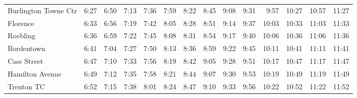 \begin{center}
\begin{tabular}{@{}lrrrrrrrrrrrrr@{}}
Burlington Towne Ctr & 6:27 & 6:50 & 7:13 & 7:36 & 7:59 & 8:22 & 8:45 & 9:08 & 9:31 & 9:57 & 10:27 & 10:57 & 11:27 \\
Florence & 6:33 & 6:56 & 7:19 & 7:42 & 8:05 & 8:28 & 8:51 & 9:14 & 9:37 & 10:03 & 10:33 & 11:03 & 11:33 \\
Roebling & 6:36 & 6:59 & 7:22 & 7:45 & 8:08 & 8:31 & 8:54 & 9:17 & 9:40 & 10:06 & 10:36 & 11:06 & 11:36 \\
Bordentown & 6:41 & 7:04 & 7:27 & 7:50 & 8:13 & 8:36 & 8:59 & 9:22 & 9:45 & 10:11 & 10:41 & 11:11 & 11:41 \\
Cass Street & 6:47 & 7:10 & 7:33 & 7:56 & 8:19 & 8:42 & 9:05 & 9:28 & 9:51 & 10:17 & 10:47 & 11:17 & 11:47 \\
Hamilton Avenue & 6:49 & 7:12 & 7:35 & 7:58 & 8:21 & 8:44 & 9:07 & 9:30 & 9:53 & 10:19 & 10:49 & 11:19 & 11:49 \\
Trenton TC & 6:52 & 7:15 & 7:38 & 8:01 & 8:24 & 8:47 & 9:10 & 9:33 & 9:56 & 10:22 & 10:52 & 11:22 & 11:52 \\
\bottomrule\end{tabular}\end{center}
